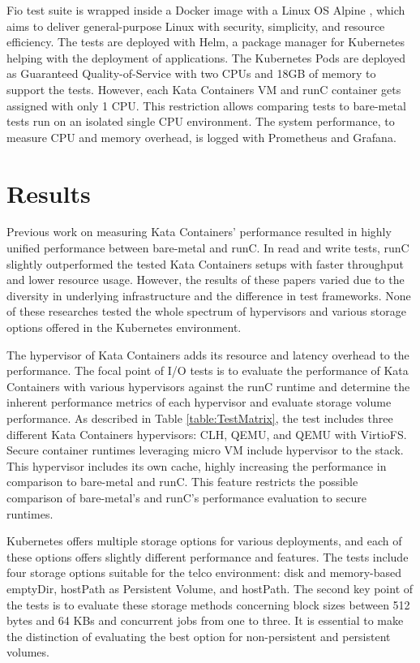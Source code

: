 Fio test suite is wrapped inside a Docker image with a Linux OS Alpine \cite{Alpine}, which aims to deliver general-purpose Linux with security, simplicity, and resource efficiency. The tests are deployed with Helm\cite{Helm}, a package manager for Kubernetes helping with the deployment of applications. The Kubernetes Pods are deployed as Guaranteed Quality-of-Service with two CPUs and 18GB of memory to support the tests. However, each Kata Containers VM and runC container gets assigned with only 1 CPU. This restriction allows comparing tests to bare-metal tests run on an isolated single CPU environment. The system performance, to measure CPU and memory overhead, is logged with Prometheus and Grafana.

\section{Results}

Previous work \cite{EverartsdeVelp2020}\cite{Kumar2020}\cite{StackHPCKata}\cite{Randazzo2019} on measuring Kata Containers' performance resulted in highly unified performance between bare-metal and runC. In read and write tests, runC slightly outperformed the tested Kata Containers setups with faster throughput and lower resource usage. However, the results of these papers varied due to the diversity in underlying infrastructure and the difference in test frameworks. None of these researches tested the whole spectrum of hypervisors and various storage options offered in the Kubernetes environment.

The hypervisor of Kata Containers adds its resource and latency overhead to the performance. The focal point of I/O tests is to evaluate the performance of Kata Containers with various hypervisors against the runC runtime and determine the inherent performance metrics of each hypervisor and evaluate storage volume performance. As described in Table \ref{table:TestMatrix}, the test includes three different Kata Containers hypervisors: CLH, QEMU, and QEMU with VirtioFS. Secure container runtimes leveraging micro VM include hypervisor to the stack. This hypervisor includes its own cache, highly increasing the performance in comparison to bare-metal and runC. This feature restricts the possible comparison of bare-metal's and runC's performance evaluation to secure runtimes.

Kubernetes offers multiple storage options for various deployments, and each of these options offers slightly different performance and features. The tests include four storage options suitable for the telco environment: disk and memory-based emptyDir, hostPath as Persistent Volume, and hostPath. The second key point of the tests is to evaluate these storage methods concerning block sizes between 512 bytes and 64 KBs and concurrent jobs from one to three. It is essential to make the distinction of evaluating the best option for non-persistent and persistent volumes.

